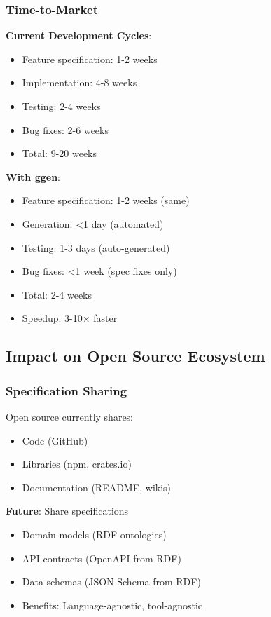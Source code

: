 \subsubsection{Time-to-Market}

\textbf{Current Development Cycles}:
\begin{itemize}
    \item Feature specification: 1-2 weeks
    \item Implementation: 4-8 weeks
    \item Testing: 2-4 weeks
    \item Bug fixes: 2-6 weeks
    \item Total: 9-20 weeks
\end{itemize}

\textbf{With ggen}:
\begin{itemize}
    \item Feature specification: 1-2 weeks (same)
    \item Generation: <1 day (automated)
    \item Testing: 1-3 days (auto-generated)
    \item Bug fixes: <1 week (spec fixes only)
    \item Total: 2-4 weeks
    \item Speedup: 3-10× faster
\end{itemize}

\subsection{Impact on Open Source Ecosystem}

\subsubsection{Specification Sharing}

Open source currently shares:
\begin{itemize}
    \item Code (GitHub)
    \item Libraries (npm, crates.io)
    \item Documentation (README, wikis)
\end{itemize}

\textbf{Future}: Share specifications
\begin{itemize}
    \item Domain models (RDF ontologies)
    \item API contracts (OpenAPI from RDF)
    \item Data schemas (JSON Schema from RDF)
    \item Benefits: Language-agnostic, tool-agnostic
\end{itemize}


